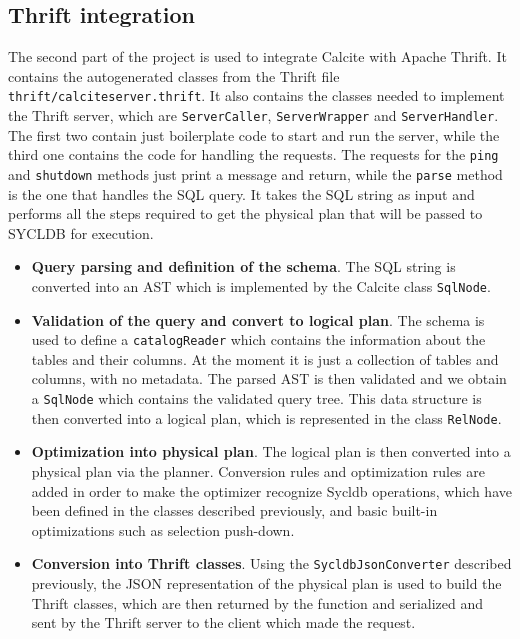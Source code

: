\documentclass[a4paper, 10pt]{article}
\begin{document}
\subsection{Thrift integration}

The second part of the project is used to integrate Calcite with Apache Thrift. It contains the autogenerated classes from the Thrift file \texttt{thrift/calciteserver.thrift}. It also contains the classes needed to implement the Thrift server, which are \texttt{ServerCaller}, \texttt{ServerWrapper} and \texttt{ServerHandler}. The first two contain just boilerplate code to start and run the server, while the third one contains the code for handling the requests. The requests for the \texttt{ping} and \texttt{shutdown} methods just print a message and return, while the \texttt{parse} method is the one that handles the SQL query. It takes the SQL string as input and performs all the steps required to get the physical plan that will be passed to SYCLDB for execution.
\begin{itemize}
    \item \textbf{Query parsing and definition of the schema}. The SQL string is converted into an AST which is implemented by the Calcite class \texttt{SqlNode}.
    \item \textbf{Validation of the query and convert to logical plan}. The schema is used to define a \texttt{catalogReader} which contains the information about the tables and their columns. At the moment it is just a collection of tables and columns, with no metadata. The parsed AST is then validated and we obtain a \texttt{SqlNode} which contains the validated query tree. This data structure is then converted into a logical plan, which is represented in the class \texttt{RelNode}.
    \item \textbf{Optimization into physical plan}. The logical plan is then converted into a physical plan via the planner. Conversion rules and optimization rules are added in order to make the optimizer recognize Sycldb operations, which have been defined in the classes described previously, and basic built-in optimizations such as selection push-down.
    \item \textbf{Conversion into Thrift classes}. Using the \texttt{SycldbJsonConverter} described previously, the JSON representation of the physical plan is used to build the Thrift classes, which are then returned by the function and serialized and sent by the Thrift server to the client which made the request.
\end{itemize}
\end{document}
